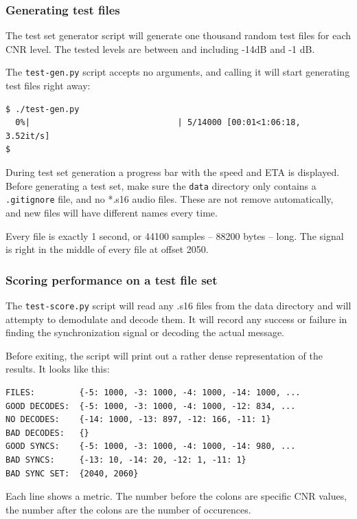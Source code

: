 \documentclass[a4paper]{article}
\begin{document}
\subsubsection{Generating test files}

The test set generator script will generate one thousand random test 
files for each CNR level. The tested levels are between and including
-14dB and -1 dB.

The \texttt{test-gen.py} script accepts no arguments, and calling it 
will start generating test files right away:

\begin{lstlisting}
$ ./test-gen.py 
  0%|                              | 5/14000 [00:01<1:06:18,  3.52it/s]
$
\end{lstlisting}

During test set generation a progress bar with the speed and ETA is 
displayed. Before generating a test set, make sure the \texttt{data} 
directory only contains a \texttt{.gitignore} file, and no *.s16 audio 
files. These are not remove automatically, and new files will have 
different names every time.

Every file is exactly 1 second, or 44100 samples -- 88200 bytes -- 
long. The signal is right in the middle of every file at offset 2050.

\subsubsection{Scoring performance on a test file set}

The \texttt{test-score.py} script will read any .s16 files from the 
data directory and will attempty to demodulate and decode them. It will 
record any success or failure in finding the synchronization signal or 
decoding the actual message.

Before exiting, the script will print out a rather dense representation 
of the results. It looks like this:

\begin{lstlisting}
FILES:         {-5: 1000, -3: 1000, -4: 1000, -14: 1000, ...
GOOD DECODES:  {-5: 1000, -3: 1000, -4: 1000, -12: 834, ...
NO DECODES:    {-14: 1000, -13: 897, -12: 166, -11: 1}
BAD DECODES:   {}
GOOD SYNCS:    {-5: 1000, -3: 1000, -4: 1000, -14: 980, ...
BAD SYNCS:     {-13: 10, -14: 20, -12: 1, -11: 1}
BAD SYNC SET:  {2040, 2060}
\end{lstlisting}

Each line shows a metric. The number before the colons are specific CNR 
values, the number after the colons are the number of occurences.
\end{document}
